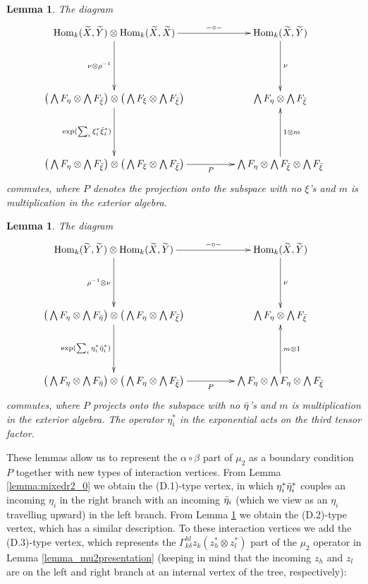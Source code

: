 \documentclass[english,letter paper,12pt,leqno]{article}
\newtheorem{lemma}[theorem]{Lemma}
\theoremstyle{example}
\numberwithin{equation}{section}
\def\Hom{\operatorname{Hom}}
\def\be{\begin{equation}}
\def\ee{\end{equation}}
\begin{document}
\begin{lemma}\label{lemma:mixedr2_1} The diagram
\be
\xymatrix@C+2pc@R+2pc{
\Hom_k( \widetilde{X}, \widetilde{Y} ) \otimes \Hom_k( \widetilde{X}, \widetilde{X} ) \ar[d]_-{\nu \otimes \rho^{-1}} \ar[r]^-{- \circ -} & \Hom_k( \widetilde{X}, \widetilde{Y} ) \ar[d]^-\nu\\
\big( \bigwedge F_\eta \otimes \bigwedge F_{\Bar{\xi}} \big) \otimes \big( \bigwedge F_\xi \otimes \bigwedge F_{\Bar{\xi}} \big) \ar[d]_-{\exp( \sum_i \xi_i^* \Bar{\xi}_i^* )} & \bigwedge F_\eta \otimes \bigwedge F_{\Bar{\xi}} \\
\big( \bigwedge F_\eta \otimes \bigwedge F_{\Bar{\xi}} \big) \otimes \big( \bigwedge F_\xi \otimes \bigwedge F_{\Bar{\xi}} \big) \ar[r]_-P & \bigwedge F_\eta \otimes \bigwedge F_{\Bar{\xi}} \otimes \bigwedge F_{\Bar{\xi}} \ar[u]_-{1 \otimes m}
}
\ee
commutes, where $P$ denotes the projection onto the subspace with no $\xi$'s and $m$ is multiplication in the exterior algebra.
\end{lemma}

\begin{lemma}\label{lemma:mixedr2_2} The diagram
\be
\xymatrix@C+2pc@R+2pc{
\Hom_k( \widetilde{Y}, \widetilde{Y} ) \otimes \Hom_k( \widetilde{X}, \widetilde{Y} ) \ar[d]_-{\rho^{-1} \otimes \nu} \ar[r]^-{- \circ -} & \Hom_k( \widetilde{X}, \widetilde{Y} ) \ar[d]^-\nu\\
\big( \bigwedge F_\eta \otimes \bigwedge F_{\Bar{\eta}} \big) \otimes \big( \bigwedge F_\eta \otimes \bigwedge F_{\Bar{\xi}} \big) \ar[d]_-{\exp( \sum_i \eta_i^* \Bar{\eta}_i^* )} & \bigwedge F_\eta \otimes \bigwedge F_{\Bar{\xi}} \\
\big( \bigwedge F_\eta \otimes \bigwedge F_{\Bar{\eta}} \big) \otimes \big( \bigwedge F_\eta \otimes \bigwedge F_{\Bar{\xi}} \big) \ar[r]_-P & \bigwedge F_\eta \otimes \bigwedge F_\eta \otimes \bigwedge F_{\Bar{\xi}} \ar[u]_-{m \otimes 1}
}
\ee
commutes, where $P$ projects onto the subspace with no $\Bar{\eta}$'s and $m$ is multiplication in the exterior algebra. The operator $\eta_i^*$ in the exponential acts on the third tensor factor.
\end{lemma}

These lemmas allow us to represent the $\alpha \circ \beta$ part of $\mu_2$ as a boundary condition $P$ together with new types of interaction vertices. From Lemma \ref{lemma:mixedr2_0} we obtain the (D.1)-type vertex, in which $\eta_i^*\Bar{\eta}_i^*$ couples an incoming $\eta_i$ in the right branch with an incoming $\Bar{\eta}_i$ (which we view as an $\eta_i$ travelling upward) in the left branch. From Lemma \ref{lemma:mixedr2_1} we obtain the (D.2)-type vertex, which has a similar description. To these interaction vertices we add the (D.3)-type vertex, which represents the $\Gamma^{hl}_{k\delta}z_k( z_h^* \otimes z_l^* )$ part of the $\mu_2$ operator in Lemma \ref{lemma_mu2presentation} (keeping in mind that the incoming $z_h$ and $z_l$ are on the left and right branch at an internal vertex of the tree, respectively):
\end{document}

